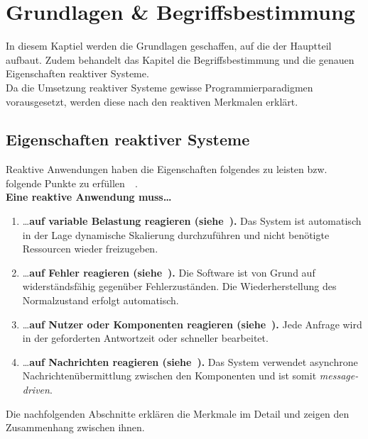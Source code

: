 \chapter{Grundlagen \& Begriffsbestimmung}
In diesem Kaptiel werden die Grundlagen geschaffen, auf die der Hauptteil aufbaut. Zudem behandelt das Kapitel die Begriffsbestimmung und die genauen Eigenschaften reaktiver Systeme.\\
Da die Umsetzung reaktiver Systeme gewisse Programmierparadigmen vorausgesetzt, werden diese nach den reaktiven Merkmalen erklärt.

\section{Eigenschaften reaktiver Systeme}
Reaktive Anwendungen haben die Eigenschaften folgendes zu leisten bzw. folgende Punkte zu erfüllen~\cite[S.~19ff]{kuhn_reactive_2015}~\cite[S.~6]{vernon_reactive_2016}.\\

\textbf{Eine reaktive Anwendung muss\ldots}
\begin{enumerate}
\item \ldots \textbf{auf variable Belastung reagieren (siehe~).} Das System ist automatisch in der Lage dynamische Skalierung durchzuführen und nicht benötigte Ressourcen wieder freizugeben.
\item \ldots \textbf{auf Fehler reagieren (siehe~).} Die Software ist von Grund auf widerständsfähig gegenüber Fehlerzuständen. Die Wiederherstellung des Normalzustand erfolgt automatisch.
\item \ldots \textbf{auf Nutzer oder Komponenten reagieren (siehe~).} Jede Anfrage wird in der geforderten Antwortzeit oder schneller bearbeitet.
\item \ldots \textbf{auf Nachrichten reagieren (siehe~).} Das System verwendet asynchrone Nachrichtenübermittlung zwischen den Komponenten und ist somit \textit{message-driven}.
\end{enumerate}

Die nachfolgenden Abschnitte erklären die Merkmale im Detail und zeigen den Zusammenhang zwischen ihnen.


